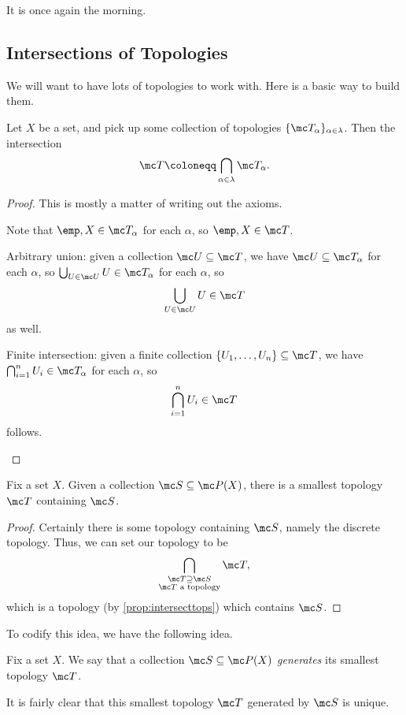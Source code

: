 \documentclass[../notes.tex]{subfiles}
\begin{document}
It is once again the morning.

\subsection{Intersections of Topologies}
We will want to have lots of topologies to work with. Here is a basic way to build them.
\begin{proposition} \label{prop:intersecttops}
	Let $X$ be a set, and pick up some collection of topologies $\{\mc T_\alpha\}_{\alpha\in\lambda}$. Then the intersection
	\[\mc T\coloneqq\bigcap_{\alpha\in\lambda}\mc T_\alpha.\]
\end{proposition}
\begin{proof}
	This is mostly a matter of writing out the axioms.
	\begin{listalph}
		\item Note that $\emp,X\in\mc T_\alpha$ for each $\alpha$, so $\emp,X\in\mc T$. 
		\item Arbitrary union: given a collection $\mc U\subseteq\mc T$, we have $\mc U\subseteq\mc T_\alpha$ for each $\alpha$, so $\bigcup_{U\in\mc U}U\in\mc T_\alpha$ for each $\alpha$, so
		\[\bigcup_{U\in\mc U}U\in\mc T\]
		as well.
		\item Finite intersection: given a finite collection $\{U_1,\ldots,U_n\}\subseteq\mc T$, we have $\bigcap_{i=1}^nU_i\in\mc T_\alpha$ for each $\alpha$, so
		\[\bigcap_{i=1}^nU_i\in\mc T\]
		follows.
		\qedhere
	\end{listalph}
\end{proof}
\begin{corollary}
	Fix a set $X$. Given a collection $\mc S\subseteq\mc P(X)$, there is a smallest topology $\mc T$ containing $\mc S$.
\end{corollary}
\begin{proof}
	Certainly there is some topology containing $\mc S$, namely the discrete topology. Thus, we can set our topology to be
	\[\bigcap_{\substack{\mc T\supseteq\mc S\\\mc T\text{ a topology}}}\mc T,\]
	which is a topology (by \autoref{prop:intersecttops}) which contains $\mc S$.
\end{proof}
To codify this idea, we have the following idea.
\begin{notation}
	Fix a set $X$. We say that a collection $\mc S\subseteq\mc P(X)$ \textit{generates} its smallest topology $\mc T$.
\end{notation}
\begin{remark}
	It is fairly clear that this smallest topology $\mc T$ generated by $\mc S$ is unique.
\end{remark}
\end{document}
